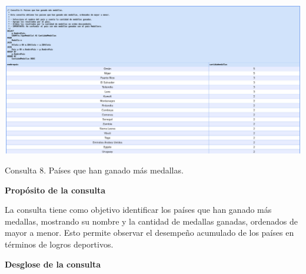 \begin{center}
	\includegraphics[width=16.5cm]{resources/Chapters/Consultas/Imagenes/Consulta8.jpg} 
	
	Consulta 8. Países que han ganado más medallas.
\end{center}

\textbf{Propósito de la consulta}

La consulta tiene como objetivo identificar los países que han ganado más medallas, mostrando su nombre y la cantidad de medallas ganadas, ordenados de mayor a menor. Esto permite observar el desempeño acumulado de los países en términos de logros deportivos.

\textbf{Desglose de la consulta}

